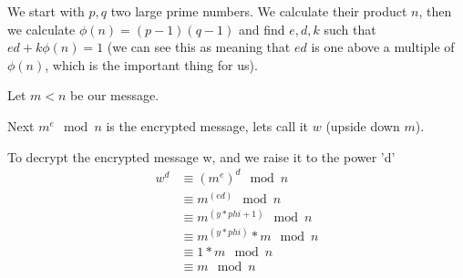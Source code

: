 \documentclass{article}
\begin{document}
We start with $p,q$ two large prime numbers.  We calculate their product $n$, then we calculate $\phi(n) = (p-1)(q-1)$ and find $e,d,k$ such that $ed + k\phi(n) = 1$ (we can see this as meaning that $ed$ is one above a multiple of $\phi(n)$, which is the important thing for us).


Let $m < n$ be our message.

Next $m^e \mod{n}$ is the encrypted message, lets call it $w$ (upside down $m$).

 To decrypt the encrypted message w, and we raise it to the power 'd'
\begin{align}
 w^d &\equiv (m^e)^d \mod{n} \\
     &\equiv m^(ed) \mod{n} \\
     &\equiv m^(y*phi + 1) \mod{n} \\
     &\equiv m^(y*phi) * m  \mod{n} \\
     &\equiv     1     * m \mod{n} \\
     &\equiv m \mod{n}
\end{align}
\end{document}
